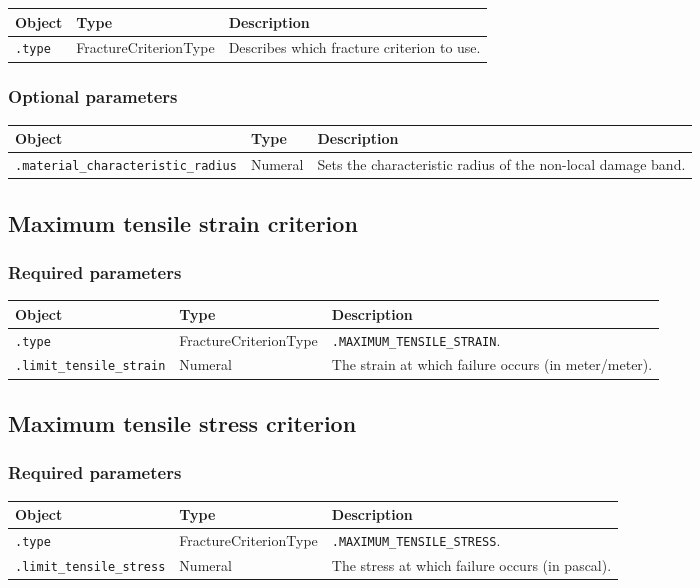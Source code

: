 \documentclass[10pt]{article}
\begin{document}
\begin{tabularx}{\textwidth}{llX}
\hline 
Object & Type & Description \\ 
\hline 
\verb+.type+ & FractureCriterionType & Describes which fracture criterion to use. \\ 
\hline 
\end{tabularx}

\subsubsection*{Optional parameters}

\begin{tabularx}{\textwidth}{llX}
\hline 
Object & Type & Description \\ 
\hline 
\verb+.material_characteristic_radius+ & Numeral & Sets the characteristic radius of the non-local damage band. \\ 
\hline 
\end{tabularx}

\subsection{Maximum tensile strain criterion}

\subsubsection*{Required parameters}

\begin{tabularx}{\textwidth}{llX}
\hline 
Object & Type & Description \\ 
\hline 
\verb+.type+ & FractureCriterionType & \verb+.MAXIMUM_TENSILE_STRAIN+. \\ 
\verb+.limit_tensile_strain+ & Numeral & The strain at which failure occurs (in meter/meter).\\
\hline 
\end{tabularx}

\subsection{Maximum tensile stress criterion}

\subsubsection*{Required parameters}

\begin{tabularx}{\textwidth}{llX}
\hline 
Object & Type & Description \\ 
\hline 
\verb+.type+ & FractureCriterionType & \verb+.MAXIMUM_TENSILE_STRESS+. \\ 
\verb+.limit_tensile_stress+ & Numeral & The stress at which failure occurs (in pascal).\\
\hline 
\end{tabularx}
\end{document}
